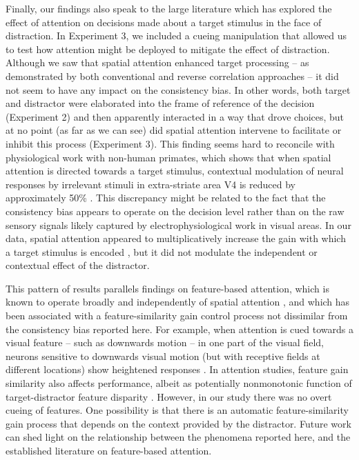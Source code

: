 \documentclass[a4paper, nobind]{templates/ociamthesis}
\begin{document}
Finally, our findings also speak to the large literature which has explored the effect of attention on decisions made about a target stimulus in the face of distraction. In Experiment 3, we included a cueing manipulation that allowed us to test how attention might be deployed to mitigate the effect of distraction. Although we saw that spatial attention enhanced target processing -- as demonstrated by both conventional and reverse correlation approaches -- it did not seem to have any impact on the consistency bias. In other words, both target and distractor were elaborated into the frame of reference of the decision (Experiment 2) and then apparently interacted in a way that drove choices, but at no point (as far as we can see) did spatial attention intervene to facilitate or inhibit this process (Experiment 3). This finding seems hard to reconcile with physiological work with non-human primates, which shows that when spatial attention is directed towards a target stimulus, contextual modulation of neural responses by irrelevant stimuli in extra-striate area V4 is reduced by approximately 50\% \autocite{sundberg2009}. This discrepancy might be related to the fact that the consistency bias appears to operate on the decision level rather than on the raw sensory signals likely captured by electrophysiological work in visual areas. In our data, spatial attention appeared to multiplicatively increase the gain with which a target stimulus is encoded \autocite{carandini2012}, but it did not modulate the independent or contextual effect of the distractor.

This pattern of results parallels findings on feature-based attention, which is known to operate broadly and independently of spatial attention \autocite{liu2007}, and which has been associated with a feature-similarity gain control process not dissimilar from the consistency bias reported here. For example, when attention is cued towards a visual feature -- such as downwards motion -- in one part of the visual field, neurons sensitive to downwards visual motion (but with receptive fields at different locations) show heightened responses \autocite{treue1999}. In attention studies, feature gain similarity also affects performance, albeit as potentially nonmonotonic function of target-distractor feature disparity \autocite{stormer2014,liu2019}. However, in our study there was no overt cueing of features. One possibility is that there is an automatic feature-similarity gain process that depends on the context provided by the distractor. Future work can shed light on the relationship between the phenomena reported here, and the established literature on feature-based attention.
\end{document}
